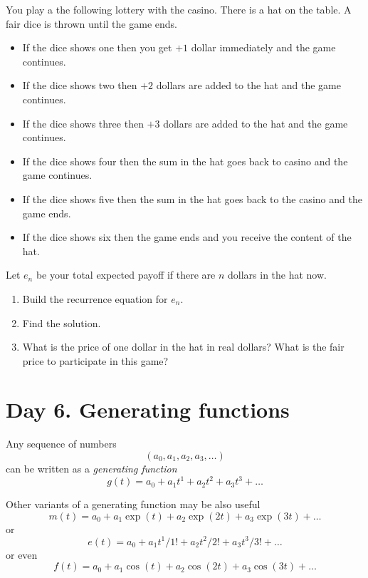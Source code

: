 \documentclass[12pt]{article}
\begin{document}
\begin{exercise}
You play a the following lottery with the casino. There is a hat on the table. 
A fair dice is thrown until the game ends. 
\begin{itemize}
    \item If the dice shows one then you get $+1$ dollar immediately and the game continues. 
    \item If the dice shows two then $+2$ dollars are added to the hat and the game continues. 
    \item If the dice shows three then $+3$ dollars are added to the hat and the game continues.
    \item If the dice shows four then the sum in the hat goes back to casino and the game continues.
    \item If the dice shows five then the sum in the hat goes back to the casino and the game ends.
    \item If the dice shows six then the game ends and you receive the content of the hat. 
\end{itemize}

Let $e_n$ be your total expected payoff if there are $n$ dollars in the hat now. 

\begin{enumerate}
    \item Build the recurrence equation for $e_n$.
    \item Find the solution.
    \item What is the price of one dollar in the hat in real dollars? What is the fair price to participate in this game?
\end{enumerate}
\end{exercise}


\section{Day 6. Generating functions}

\begin{idea}
    Any sequence of numbers 
    \[
    (a_0, a_1, a_2, a_3, \dots)
    \] 
    can be written as a \emph{generating function}
    \[
    g(t) = a_0 + a_1 t^1 + a_2 t^2 + a_3 t^3 + \dots
    \]

    Other variants of a generating function may be also useful 
    \[
    m(t) = a_0 + a_1 \exp(t) + a_2 \exp(2t) + a_3 \exp(3t) + \dots
    \]
    or 
    \[
    e(t) = a_0 + a_1 t^1/1! + a_2 t^2/2! + a_3 t^3 / 3! + \dots
    \]
    or even 
    \[
    f(t) = a_0 + a_1 \cos(t) + a_2 \cos(2t) + a_3 \cos(3t) + \dots
    \]
\end{idea}
\end{document}

